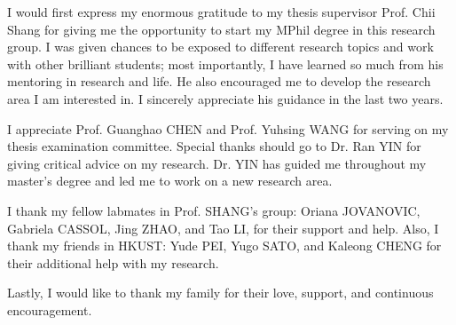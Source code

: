 \acknowledgments

I would first express my enormous gratitude to my thesis supervisor Prof. Chii Shang for giving me the opportunity to start my MPhil degree in this research group. I was given chances to be exposed to different research topics and work with other brilliant students; most importantly, I have learned so much from his mentoring in research and life. He also encouraged me to develop the research area I am interested in. I sincerely appreciate his guidance in the last two years.

I appreciate Prof. Guanghao CHEN and Prof. Yuhsing WANG for serving on my thesis examination committee. Special thanks should go to Dr. Ran YIN for giving critical advice on my research. Dr. YIN has guided me throughout my master's degree and led me to work on a new research area.

I thank my fellow labmates in Prof. SHANG's group: Oriana JOVANOVIC, Gabriela CASSOL, Jing ZHAO, and Tao LI, for their support and help. Also, I thank my friends in HKUST: Yude PEI, Yugo SATO, and Kaleong CHENG for their additional help with my research.

Lastly, I would like to thank my family for their love, support, and continuous encouragement.

\endacknowledgments
 